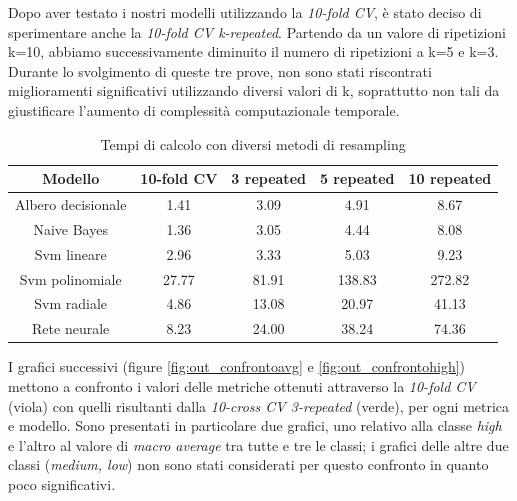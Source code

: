         Dopo aver testato i nostri modelli utilizzando la \textit{10-fold CV}, è stato deciso di sperimentare anche la \textit{10-fold CV k-repeated}. Partendo da un valore di ripetizioni k=10, abbiamo successivamente diminuito il numero di ripetizioni a k=5 e k=3. Durante lo svolgimento di queste tre prove, non sono stati riscontrati miglioramenti significativi utilizzando diversi valori di k, soprattutto non tali da giustificare l'aumento di complessità computazionale temporale.\\
        
        \begin{table}[h]
            \begin{tabular}{| c | c | c | c | c |}
                \hline
                 \textbf{Modello} & \textbf{10-fold CV} & \textbf{3 repeated} & \textbf{5 repeated} & \textbf{10 repeated}\\ 
                 \hline
                 Albero decisionale & 1.41 & 3.09 & 4.91 & 8.67 \\
                 Naive Bayes & 1.36 & 3.05 & 4.44 & 8.08 \\
                 Svm lineare & 2.96 & 3.33 & 5.03 & 9.23 \\
                 Svm polinomiale & 27.77 & 81.91 & 138.83 & 272.82 \\
                 Svm radiale & 4.86 & 13.08 & 20.97 & 41.13 \\
                 Rete neurale & 8.23 & 24.00 & 38.24 & 74.36 \\
                 \hline
            \end{tabular} 
            \caption{Tempi di calcolo con diversi metodi di resampling}
        \end{table}
        
        
        I grafici successivi (figure \ref{fig:out_confrontoavg} e \ref{fig:out_confrontohigh}) mettono a confronto i valori delle metriche ottenuti attraverso la \textit{10-fold CV} (viola) con quelli risultanti dalla \textit{10-cross CV 3-repeated} (verde), per ogni metrica e modello. Sono presentati in particolare due grafici, uno relativo alla classe \textit{high} e l'altro al valore di \textit{macro average} tra tutte e tre le classi; i grafici delle altre due classi (\textit{medium, low}) non sono stati considerati per questo confronto in quanto poco significativi.
        
